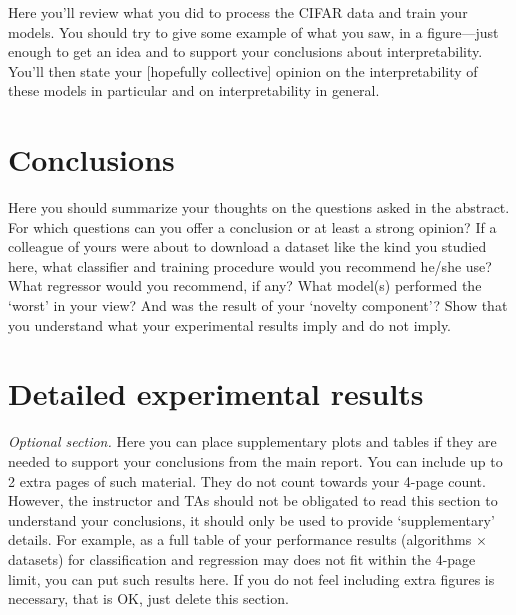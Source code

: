 \documentclass[10pt,twocolumn,letterpaper]{article}
\begin{document}
Here you'll review what you did to process the CIFAR data and train your models.
You should try to give some example of what you saw, in a figure---just enough to get
an idea and to support your conclusions about interpretability.
You'll then state your [hopefully collective] opinion on the interpretability of
these models in particular and on interpretability in general.



\section{Conclusions}

Here you should summarize your thoughts on the questions asked in the abstract.
For which questions can you offer a conclusion or at least a strong opinion?
If a colleague of yours were about to download a dataset like the kind you studied here,
what classifier and training procedure would you recommend he/she use?
What regressor would you recommend, if any?
What model(s) performed the `worst' in your view?
And was the result of your `novelty component'?
Show that you understand what your experimental results imply and do not imply.



\appendix

\section{Detailed experimental results}

{\em Optional section.} Here you can place supplementary plots and tables if they are needed to
support your conclusions from the main report.
You can include up to 2 extra pages of such material.
They do not count towards your 4-page count.
However, the instructor and TAs should not be obligated to read this
section to understand your conclusions, it should only be used to provide `supplementary' details.
For example, as a full table of your performance results (algorithms $\times$ datasets)
for classification and regression may does not fit within the 4-page limit,
you can put such results here.
If you do not feel including extra figures is necessary, that is OK, just delete this section.


\end{document}
